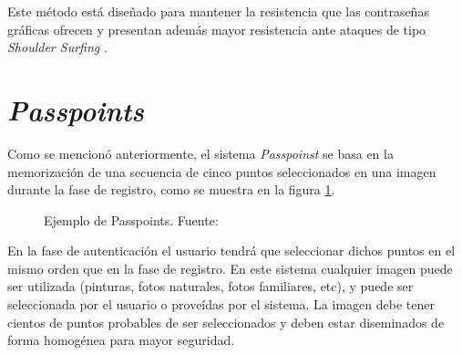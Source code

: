 Este método está diseñado para mantener la resistencia que las contraseñas gráficas ofrecen y presentan adem\'as mayor resistencia ante ataques de tipo \textit{Shoulder Surfing} 
 \cite{lashkari2009shoulder}.






\section{\textit{Passpoints}}

Como se mencionó anteriormente, el sistema \textit{Passpoinst} \cite{wiedenbeck2005passpoints} se basa en la memorización de una secuencia de cinco puntos seleccionados en una imagen durante la fase de registro, como se muestra en la figura \ref{passpoints-example}.

\begin{figure}[H]
	\centering
		\begin{minipage}[b]{0.7\linewidth}  %
		\centering
		\caption{Ejemplo de Passpoints. Fuente: \cite{wiedenbeck2005passpoints}}
		\label{passpoints-example}
	\end{minipage}%
	
\end{figure}
En la fase de autenticación el usuario tendrá  que  seleccionar dichos puntos en el mismo orden que en la fase de registro. En  este  sistema  cualquier  imagen  puede  ser  utilizada  (pinturas,  fotos  naturales,  fotos  familiares,  etc),  y  puede  ser seleccionada  por  el  usuario  o proveídas por  el  sistema.  La  imagen  debe  tener  cientos  de  puntos  probables  de  ser seleccionados y deben estar diseminados de forma homogénea para mayor seguridad.
 
